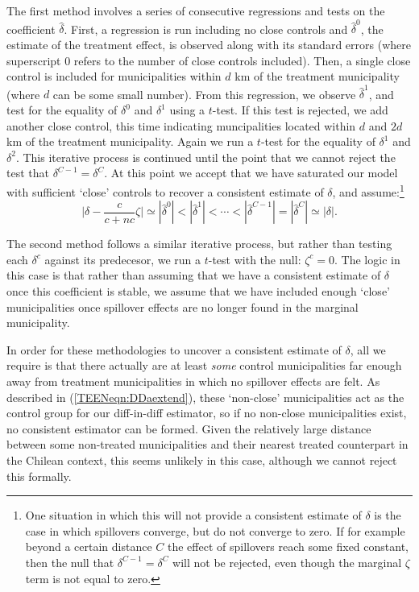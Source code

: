 The first method involves a series of consecutive regressions and tests on the
coefficient $\widehat\delta$.  First, a regression is run including no close
controls and $\hat\delta^0$, the estimate of the treatment effect, is observed 
along with its standard errors (where superscript 0 refers to the number of 
close controls included).  Then, a single close control is included for 
municipalities within $d$ km of the treatment municipality (where $d$ can be 
some small number).  From this regression, we observe $\hat\delta^1$, and test 
for the equality of $\delta^0$  and $\delta^1$ using a $t$-test.  If this test 
is rejected, we add another close control, this time indicating muncipalities 
located within $d$ and $2d$ km of the treatment municipality.  Again we run a 
$t$-test for the equality of $\delta^1$ and $\delta^2$.  This iterative process 
is continued until the point that we cannot reject the test that $\delta^{C-1}=
\delta^C$.  At this point we accept that we have saturated our model with 
sufficient `close' controls to recover a consistent estimate of $\delta$, and 
assume:\footnote{One situation in which this will not provide a consistent 
estimate of $\delta$ is the case in which spillovers converge, but do not 
converge to zero.  If for example beyond a certain distance $C$ the effect of 
spillovers reach some fixed constant, then the null that $\delta^{C-1}=
\delta^C$ will not be rejected, even though the marginal $\zeta$ term is not 
equal to zero.}
\begin{equation}
\label{TEENeqn:inequalitiesDelta}
\bigg|\delta-\frac{c}{c+nc}\zeta\bigg|\simeq|\hat\delta^0|<|\hat\delta^1|<\cdots<
|\hat\delta^{C-1}|=|\hat\delta^C|\simeq|\delta|.
\end{equation}

The second method follows a similar iterative process, but rather than testing
each $\delta^c$ against its predecesor, we run a $t$-test with the null:
$\zeta^c=0$.  The logic in this case is that rather than assuming that we
have a consistent estimate of $\delta$ once this coefficient is stable, we
assume that we have included enough `close' municipalities once spillover 
effects are no longer found in the marginal municipality.

In order for these methodologies to uncover a consistent estimate of $\delta$,
all we require is that there actually are at least \emph{some} control 
municipalities far enough away from treatment municipalities in which no 
spillover effects are felt.  As described in (\ref{TEENeqn:DDaextend}), these 
`non-close' municipalities act as the control group for our diff-in-diff estimator, 
so if no non-close municipalities exist, no consistent estimator can be formed.  
Given the relatively large distance between some non-treated municipalities and 
their nearest treated counterpart in the Chilean context, this seems unlikely in 
this case, although we cannot reject this formally.

